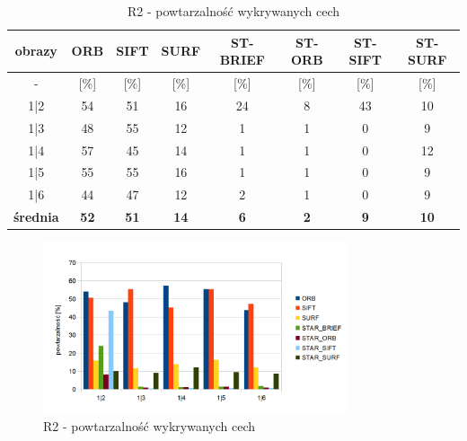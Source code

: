 \begin{table}[htbp]
  \centering
  \caption{R2 - powtarzalność wykrywanych cech}
    \begin{tabular}{|c|c|c|c|c|c|c|c|}\hline

    obrazy & \textbf{ORB} & \textbf{SIFT} & \textbf{SURF} & \textbf{ST-BRIEF} & \textbf{ST-ORB} & \textbf{ST-SIFT} & \textbf{ST-SURF} \\\hline

    -  & [\%] & [\%] & [\%] & [\%] & [\%] & [\%] & [\%] \\\hline
    1|2 & 54 & 51 & 16 & 24 & 8 & 43 & 10 \\
    1|3 & 48 & 55 & 12 & 1 & 1 & 0 & 9 \\
    1|4 & 57 & 45 & 14 & 1 & 1 & 0 & 12 \\
    1|5 & 55 & 55 & 16 & 1 & 1 & 0 & 9 \\
    1|6 & 44 & 47 & 12 & 2 & 1 & 0 & 9 \\\hline
    \textbf{średnia} & \textbf{52} & \textbf{51} & \textbf{14} & \textbf{6} & \textbf{2} & \textbf{9} & \textbf{10} \\\hline
    

    \end{tabular}%
  \label{tab:r2_m1}%
\end{table}%


\begin{figure}
\centering
\includegraphics[width=0.8\textwidth]{pict/slowik/r2/m1.png}
\caption{R2 - powtarzalność wykrywanych cech}
\label{fig:r2_m1}
\end{figure}

